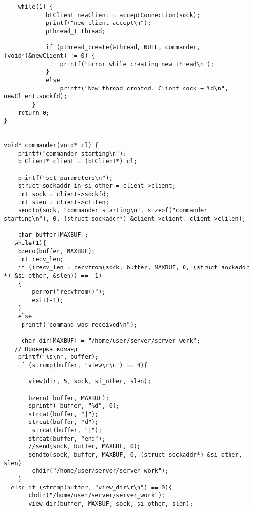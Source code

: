 \documentclass[12pt,a4paper]{report}
\begin{document}
\begin{lstlisting}
    while(1) {
            btClient newClient = acceptConnection(sock);
            printf("new client accept\n");
            pthread_t thread;

            if (pthread_create(&thread, NULL, commander, (void*)&newClient) != 0) {
                printf("Error while creating new thread\n");
            }
            else
                printf("New thread created. Client sock = %d\n", newClient.sockfd);
        }
    return 0;
}


void* commander(void* cl) {
    printf("commander starting\n");
    btClient* client = (btClient*) cl;

    printf("set parameters\n");
    struct sockaddr_in si_other = client->client;
    int sock = client->sockfd;
    int slen = client->clilen;
    sendto(sock, "commander starting\n", sizeof("commander starting\n"), 0, (struct sockaddr*) &client->client, client->clilen);

    char buffer[MAXBUF];
   while(1){
    bzero(buffer, MAXBUF);
    int recv_len;
    if ((recv_len = recvfrom(sock, buffer, MAXBUF, 0, (struct sockaddr *) &si_other, &slen)) == -1)
    {
        perror("recvfrom()");
        exit(-1);
    }
    else
     printf("command was received\n");

     char dir[MAXBUF] = "/home/user/server/server_work";
   // Проверка команд
    printf("%s\n", buffer);
    if (strcmp(buffer, "view\r\n") == 0){

       view(dir, 5, sock, si_other, slen);

       bzero( buffer, MAXBUF);
       sprintf( buffer, "%d", 0);
       strcat(buffer, "|");
       strcat(buffer, "d");
        strcat(buffer, "|");
       strcat(buffer, "end");
       //send(sock, buffer, MAXBUF, 0);
       sendto(sock, buffer, MAXBUF, 0, (struct sockaddr*) &si_other, slen);
        chdir("/home/user/server/server_work");
    }
  else if (strcmp(buffer, "view_dir\r\n") == 0){
       chdir("/home/user/server/server_work");
       view_dir(buffer, MAXBUF, sock, si_other, slen);


\end{lstlisting}
\end{document}
